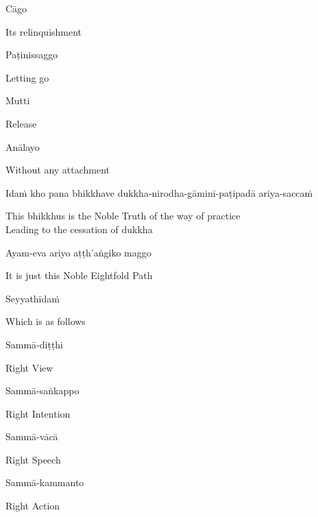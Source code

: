 Cāgo

\begin{english}
  Its relinquishment
\end{english}

Paṭinissaggo

\begin{english}
  Letting go
\end{english}

Mutti

\begin{english}
  Release
\end{english}

Anālayo

\begin{english}
  Without any attachment
\end{english}

Idaṁ kho pana bhikkhave dukkha-nirodha-gāminī-paṭipadā ariya-saccaṁ

\begin{english}
  This bhikkhus is the Noble Truth of the way of practice\\
  Leading to the cessation of dukkha
\end{english}

Ayam-eva ariyo aṭṭh’aṅgiko maggo

\begin{english}
  It is just this Noble Eightfold Path
\end{english}

Seyyathīdaṁ

\begin{english}
  Which is as follows
\end{english}

Sammā-diṭṭhi

\begin{english}
  Right View
\end{english}

Sammā-saṅkappo

\begin{english}
  Right Intention
\end{english}

Sammā-vācā

\begin{english}
  Right Speech
\end{english}

Sammā-kammanto

\begin{english}
  Right Action
\end{english}

